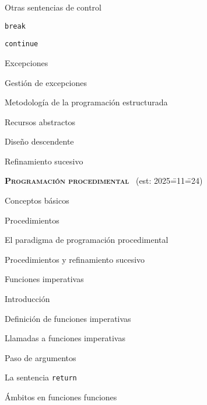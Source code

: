 \begin{longenum}
\begin{longenum}
\begin{longenum}
            \item Otras sentencias de control
            \begin{longenum}
                \item \texttt{break}
                \item \texttt{continue}
                \item Excepciones
                \begin{longenum}
                    \item Gestión de excepciones
                \end{longenum}
            \end{longenum}
        \end{longenum}
        \item Metodología de la programación estructurada
        \begin{longenum}
            \item Recursos abstractos
            \item Diseño descendente
            \item Refinamiento sucesivo
        \end{longenum}
    \end{longenum}
    \item \textbf{\textsc{Programación procedimental}} \ (est: 2025\==11\==24)
    \begin{longenum}
        \item Conceptos básicos
        \begin{longenum}
            \item Procedimientos
            \item El paradigma de programación procedimental
            \item Procedimientos y refinamiento sucesivo
        \end{longenum}
        \item Funciones imperativas
        \begin{longenum}
            \item Introducción
            \item Definición de funciones imperativas
            \item Llamadas a funciones imperativas
            \item Paso de argumentos
            \item La sentencia \texttt{return}
        \end{longenum}
        \item Ámbitos en funciones funciones

\end{longenum}
\end{longenum}
